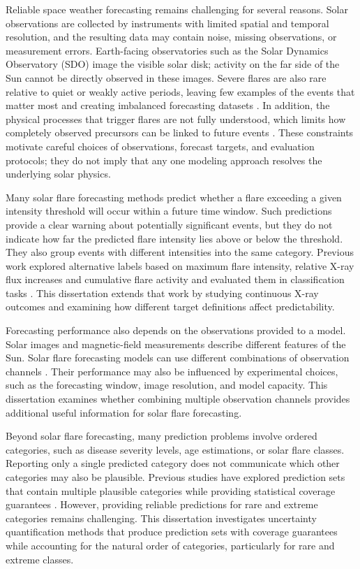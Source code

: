 \documentclass[12pt]{report}
\begin{document}
Reliable space weather forecasting remains challenging for several reasons. Solar observations are collected by instruments with limited spatial and temporal resolution, and the resulting data may contain noise, missing observations, or measurement errors. Earth-facing observatories such as the Solar Dynamics Observatory (SDO) image the visible solar disk; activity on the far side of the Sun cannot be directly observed in these images. Severe flares are also rare relative to quiet or weakly active periods, leaving few examples of the events that matter most and creating imbalanced forecasting datasets \citep{barnes2016comparison,pelkumdonahue2024transformer}. In addition, the physical processes that trigger flares are not fully understood, which limits how completely observed precursors can be linked to future events \citep{pelkumdonahue2024transformer}. These constraints motivate careful choices of observations, forecast targets, and evaluation protocols; they do not imply that any one modeling approach resolves the underlying solar physics.

Many solar flare forecasting methods predict whether a flare exceeding a given intensity threshold will occur within a future time window. Such predictions provide a clear warning about potentially significant events, but they do not indicate how far the predicted flare intensity lies above or below the threshold. They also group events with different intensities into the same category. Previous work explored alternative labels based on maximum flare intensity, relative X-ray flux increases and cumulative flare activity and evaluated them in classification tasks \citep{hong2023innovative,hong2023beyond,hong2023enhancing}. This dissertation extends that work by studying continuous X-ray outcomes and examining how different target definitions affect predictability.

Forecasting performance also depends on the observations provided to a model. Solar images and magnetic-field measurements describe different features of the Sun. Solar flare forecasting models can use different combinations of observation channels \citep{cinto2020framework,bobra2015solarflare}. Their performance may also be influenced by experimental choices, such as the forecasting window, image resolution, and model capacity. This dissertation examines whether combining multiple observation channels provides additional useful information for solar flare forecasting.

Beyond solar flare forecasting, many prediction problems involve ordered categories, such as disease severity levels, age estimations, or solar flare classes. Reporting only a single predicted category does not communicate which other categories may also be plausible. Previous studies have explored prediction sets that contain multiple plausible categories while providing statistical coverage guarantees \citep{lu2022ordinalaps}. However, providing reliable predictions for rare and extreme categories remains challenging. This dissertation investigates uncertainty quantification methods that produce prediction sets with coverage guarantees while accounting for the natural order of categories, particularly for rare and extreme classes.
\end{document}
